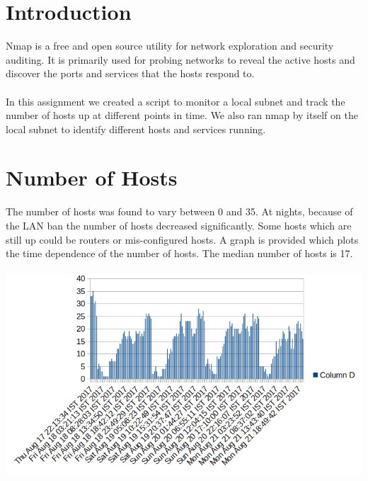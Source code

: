 \documentclass[12pt]{article}
\author{
  Singhal, Madhur\\
  \texttt{2015CS10235}
  \and
  Chhajwani, Anant\\
  \texttt{2015CS50281}
}
\begin{document}
\maketitle


\section{Introduction}
Nmap is a free and open source utility for network exploration and security auditing. It is primarily used for probing networks to reveal the active hosts and discover the ports and services that the hosts respond to. 
\paragraph{}
In this assignment we created a script to monitor a local subnet and track the number of hosts up at different points in time. We also ran nmap by itself on the local subnet to identify different hosts and services running.

\section{Number of Hosts}
The number of hosts was found to vary between 0 and 35. At nights, because of the LAN ban the number of hosts decreased significantly. Some hosts which are still up could be routers or mis-configured hosts. A graph is provided which plots the time dependence of the number of hosts. The median number of hosts is 17.

\paragraph{}
\begin{center}
\includegraphics[scale=1.0]{gr.png}
\end{center}
\end{document}
